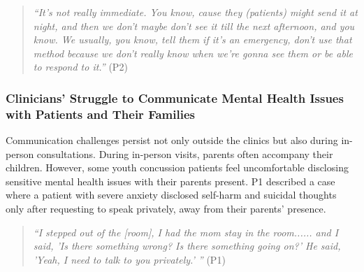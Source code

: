 
\begin{quote}
    \textit{``It's not really immediate. You know, cause they (patients) might send it at night, and then we don't maybe don't see it till the next afternoon, and you know. We usually, you know, tell them if it's an emergency, don't use that method because we don't really know when we're gonna see them or be able to respond to it.''} (P2)
\end{quote}




\subsubsection{Clinicians’ Struggle to Communicate Mental Health Issues with Patients and Their Families}\label{sec:communicationissues}


Communication challenges persist not only outside the clinics but also during in-person consultations.
During in-person visits, parents often accompany their children. However, some youth concussion patients feel uncomfortable disclosing sensitive mental health issues with their parents present.
P1 described a case where a patient with severe anxiety disclosed self-harm and suicidal thoughts only after requesting to speak privately, away from their parents' presence. 


\begin{quote}
    \textit{``I stepped out of the [room], I had the mom stay in the room...... and I said, 'Is there something wrong? Is there something going on?' He said, 'Yeah, I need to talk to you privately.' ''} (P1)
\end{quote}

